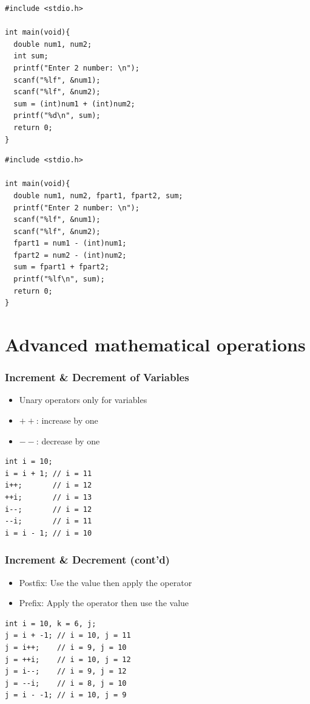 \documentclass{../c-lecture}
\begin{document}
\begin{frame}[fragile]
  \begin{verbatim}
#include <stdio.h>

int main(void){
  double num1, num2;
  int sum;
  printf("Enter 2 number: \n");
  scanf("%lf", &num1);
  scanf("%lf", &num2);
  sum = (int)num1 + (int)num2;
  printf("%d\n", sum);
  return 0;
}
  \end{verbatim}
\end{frame}

\begin{frame}[fragile]
  \begin{verbatim}
#include <stdio.h>

int main(void){
  double num1, num2, fpart1, fpart2, sum;
  printf("Enter 2 number: \n");
  scanf("%lf", &num1);
  scanf("%lf", &num2);
  fpart1 = num1 - (int)num1;
  fpart2 = num2 - (int)num2;
  sum = fpart1 + fpart2;
  printf("%lf\n", sum);
  return 0;
}
  \end{verbatim}
\end{frame}

\section{Advanced mathematical operations}

\begin{frame}[fragile]
  \frametitle{Increment \& Decrement of Variables}
  \begin{itemize}
    \item Unary operators only for variables
    \item $++$: increase by one
    \item $--$: decrease by one
  \end{itemize}
  \begin{verbatim}
int i = 10;
i = i + 1; // i = 11
i++;       // i = 12
++i;       // i = 13
i--;       // i = 12
--i;       // i = 11
i = i - 1; // i = 10
  \end{verbatim}
\end{frame}

\begin{frame}[fragile]
  \frametitle{Increment \& Decrement (cont’d)}
  \begin{itemize}
    \item
      {\color{Cyan} Postfix:} Use the value then apply the
      operator
    \item
      {\color{Cyan} Prefix:} Apply the operator then use the value
  \end{itemize}
  \begin{verbatim}
int i = 10, k = 6, j;
j = i + -1; // i = 10, j = 11
j = i++;    // i = 9, j = 10
j = ++i;    // i = 10, j = 12
j = i--;    // i = 9, j = 12
j = --i;    // i = 8, j = 10
j = i - -1; // i = 10, j = 9
  \end{verbatim}
\end{frame}
\end{document}
